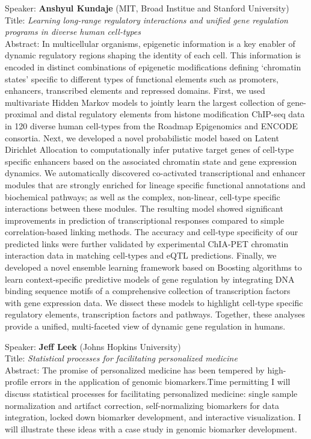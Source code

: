\documentclass[11pt]{article}
\begin{document}
\bigskip
\noindent
Speaker: {\bf Anshyul Kundaje} (MIT, Broad Institue and Stanford University)\\
Title: {\it Learning long-range regulatory interactions and unified gene regulation programs in diverse human cell-types}\\
Abstract: In multicellular organisms, epigenetic information is a key
enabler of dynamic regulatory regions shaping the identity of each
cell. This information is encoded in distinct combinations of
epigenetic modifications defining ‘chromatin states’ specific to
different types of functional elements such as promoters, enhancers,
transcribed elements and repressed domains. First, we used
multivariate Hidden Markov models to jointly learn the largest
collection of gene-proximal and distal regulatory elements from
histone modification ChIP-seq data in 120 diverse human cell-types
from the Roadmap Epigenomics and ENCODE consortia. Next, we developed
a novel probabilistic model based on Latent Dirichlet Allocation to
computationally infer putative target genes of cell-type specific
enhancers based on the associated chromatin state and gene expression
dynamics. We automatically discovered co-activated transcriptional and
enhancer modules that are strongly enriched for lineage specific
functional annotations and biochemical pathways; as well as the
complex, non-linear, cell-type specific interactions between these
modules. The resulting model showed significant improvements in
prediction of transcriptional responses compared to simple
correlation-based linking methods. The accuracy and cell-type
specificity of our predicted links were further validated by
experimental ChIA-PET chromatin interaction data in matching
cell-types and eQTL predictions. Finally, we developed a novel
ensemble learning framework based on Boosting algorithms to learn
context-specific predictive models of gene regulation by integrating
DNA binding sequence motifs of a comprehensive collection of
transcription factors with gene expression data. We dissect these
models to highlight cell-type specific regulatory elements,
transcription factors and pathways. Together, these analyses provide a
unified, multi-faceted view of dynamic gene regulation in humans.

\bigskip
\noindent
Speaker: {\bf Jeff Leek} (Johns Hopkins University)\\
Title: {\it Statistical processes for facilitating personalized medicine}\\
Abstract: The promise of personalized medicine has been tempered by
high-profile errors in the application of genomic biomarkers.Time
permitting I will discuss statistical processes for facilitating
personalized medicine: single sample normalization and artifact
correction, self-normalizing biomarkers for data integration, locked
down biomarker development, and interactive visualization. I will
illustrate these ideas with a case study in genomic biomarker
development.
\end{document}
